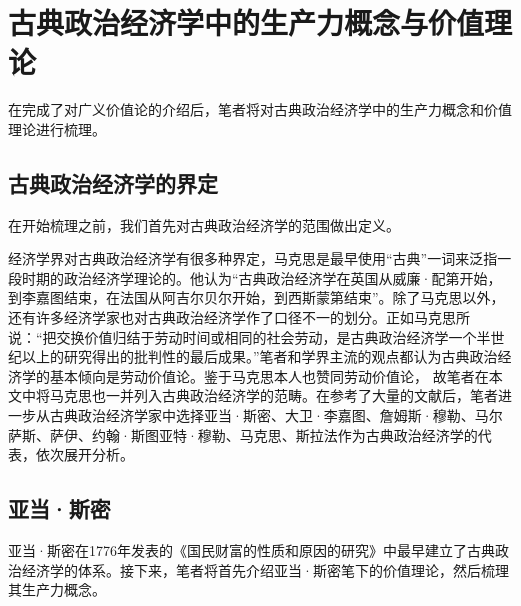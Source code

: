 
\chapter{古典政治经济学中的生产力概念与价值理论}

在完成了对广义价值论的介绍后，笔者将对古典政治经济学中的生产力概念和价值理论进行梳理。

\section{古典政治经济学的界定}

在开始梳理之前，我们首先对古典政治经济学的范围做出定义。

经济学界对古典政治经济学有很多种界定，马克思是最早使用“古典”一词来泛指一段时期的政治经济学理论的\cite[7]{YueHan*MeiNaDe*KaiEnSiJiuYeLiXiHeHuoBiTongLunChongYiBen2021}。他认为“古典政治经济学在英国从威廉·配第开始，到李嘉图结束，在法国从阿吉尔贝尔开始，到西斯蒙第结束”\cite[56]{QiaEr*MaKeSiZhengZhiJingJiXuePiPanYingWen2022}。除了马克思以外，还有许多经济学家也对古典政治经济学作了口径不一的划分\cite[5-8]{CaiJiMingCongGuDianZhengZhiJingJiXueDaoZhongGuoTeSeSheHuiZhuYiZhengZhiJingJiXueJiYuZhongGuoShiJiaoDeZhengZhiJingJiXueYanBianShangCe2023}。正如马克思所说：“把交换价值归结于劳动时间或相同的社会劳动，是古典政治经济学一个半世纪以上的研究得出的批判性的最后成果。”\cite[41]{ZhongGongZhongYangMaKeSiEnGeSiLieNingSiDaLinZhuZuoBianYiJuMaKeSiEnGeSiQuanJiDi13Juan1962}笔者和学界主流的观点\cite[45]{ChenDaiSunCongGuDianJingJiXuePaiDaoMaKeSiRuoGanZhuYaoXueShuoFaZhanLueLun2014}\cite[12]{CaiJiMingCongGuDianZhengZhiJingJiXueDaoZhongGuoTeSeSheHuiZhuYiZhengZhiJingJiXueJiYuZhongGuoShiJiaoDeZhengZhiJingJiXueYanBianShangCe2023}都认为古典政治经济学的基本倾向是劳动价值论。鉴于马克思本人也赞同劳动价值论，
故笔者在本文中将马克思也一并列入古典政治经济学的范畴。在参考了大量的文献后，笔者进一步从古典政治经济学家中选择亚当·斯密、大卫·李嘉图、詹姆斯·穆勒、马尔萨斯、萨伊、约翰·斯图亚特·穆勒、马克思、斯拉法作为古典政治经济学的代表，依次展开分析。

\section{亚当·斯密}
 
亚当·斯密在1776年发表的《国民财富的性质和原因的研究》中最早建立了古典政治经济学的体系\cite[120]{CaiJiMingCongGuDianZhengZhiJingJiXueDaoZhongGuoTeSeSheHuiZhuYiZhengZhiJingJiXueJiYuZhongGuoShiJiaoDeZhengZhiJingJiXueYanBianShangCe2023}\cite[90]{YanZhiJieXiFangJingJiXueShuoShiJiaoChengDiErBan2013}。接下来，笔者将首先介绍亚当·斯密笔下的价值理论，然后梳理其生产力概念。

